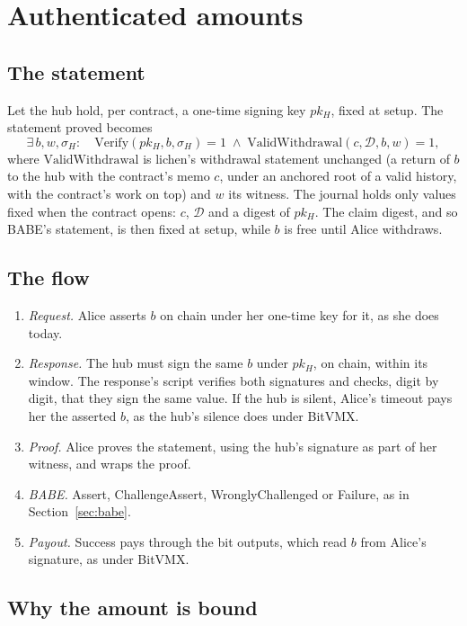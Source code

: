 \documentclass[11pt]{article}
\begin{document}
\section{Authenticated amounts}
\label{sec:auth}

\subsection{The statement}

Let the hub hold, per contract, a one-time signing key $pk_H$, fixed at
setup. The statement proved becomes
\[
  \exists\, b, w, \sigma_H:\quad
  \mathrm{Verify}(pk_H, b, \sigma_H) = 1 \;\wedge\;
  \mathrm{ValidWithdrawal}(c, \mathcal{D}, b, w) = 1,
\]
where $\mathrm{ValidWithdrawal}$ is lichen's withdrawal statement
unchanged (a return of $b$ to the hub with the contract's memo $c$, under
an anchored root of a valid history, with the contract's work on top)
and $w$ its witness. The journal holds only values fixed when the
contract opens: $c$, $\mathcal{D}$ and a digest of $pk_H$. The claim digest, and
so BABE's statement, is then fixed at setup, while $b$ is free until
Alice withdraws.

\subsection{The flow}

\begin{enumerate}[leftmargin=1.5em]
\item \emph{Request.} Alice asserts $b$ on chain under her one-time key
  for it, as she does today.
\item \emph{Response.} The hub must sign the same $b$ under $pk_H$, on
  chain, within its window. The response's script verifies both
  signatures and checks, digit by digit, that they sign the same value.
  If the hub is silent, Alice's timeout pays her the asserted $b$, as
  the hub's silence does under BitVMX.
\item \emph{Proof.} Alice proves the statement, using the hub's
  signature as part of her witness, and wraps the proof.
\item \emph{BABE.} Assert, ChallengeAssert, WronglyChallenged or
  Failure, as in Section~\ref{sec:babe}.
\item \emph{Payout.} Success pays through the bit outputs, which read
  $b$ from Alice's signature, as under BitVMX.
\end{enumerate}

\subsection{Why the amount is bound}
\label{sec:binding}
\end{document}
